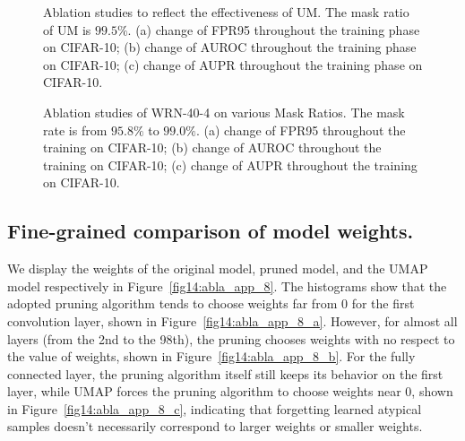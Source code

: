 \documentclass{article}
\theoremstyle{plain}
\theoremstyle{definition}
\theoremstyle{remark}
\begin{document}
\begin{figure}[t!]
    \begin{center}
    \end{center}
    \caption{Ablation studies to reflect the effectiveness of UM. The mask ratio of UM is $99.5\%$. (a) change of FPR95 throughout the training phase on CIFAR-10; (b) change of AUROC throughout the training phase  on CIFAR-10; (c) change of AUPR throughout the training phase on CIFAR-10.}
    \label{fig12:abla_app_6}
\end{figure}

\begin{figure}[t!]
    \begin{center}
    \end{center}
    \caption{Ablation studies of WRN-40-4 on various Mask Ratios. The mask rate is from $95.8\%$ to $99.0\%$. (a) change of FPR95 throughout the training on CIFAR-10; (b) change of AUROC throughout the training on CIFAR-10; (c) change of AUPR throughout the training on CIFAR-10.}
    \label{fig13:abla_app_7}
\end{figure}


\subsection{Fine-grained comparison of model weights.}
\label{app:comp_prune_umap}

We display the weights of the original model, pruned model, and the UMAP model respectively in Figure~\ref{fig14:abla_app_8}. The histograms show that the adopted pruning algorithm tends to choose weights far from $0$ for the first convolution layer, shown in Figure~\ref{fig14:abla_app_8_a}. However, for almost all layers (from the 2nd to the 98th), the pruning chooses weights with no respect to the value of weights, shown in Figure~\ref{fig14:abla_app_8_b}. For the fully connected layer, the pruning algorithm itself still keeps its behavior on the first layer, while UMAP forces the pruning algorithm to choose weights near $0$, shown in Figure~\ref{fig14:abla_app_8_c}, indicating that forgetting learned atypical samples doesn't necessarily correspond to larger weights or smaller weights.
\end{document}
